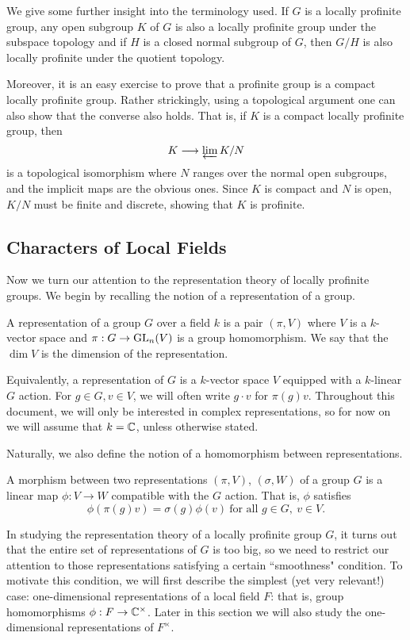We give some further insight into the terminology used. If $G$ is a locally profinite group, any open subgroup $K$ of $G$ is also a locally profinite group under the subspace topology and if $H$ is a closed normal subgroup of $G$, then $G/H$ is also locally profinite under the quotient topology. 

Moreover, it is an easy exercise to prove that a profinite group is a compact locally profinite group. Rather strickingly, using a topological argument one can also show that the converse also holds. That is, if $K$ is a compact locally profinite group, then
$$K\longrightarrow\varprojlim K/N$$
is a topological isomorphism where $N$ ranges over the normal open subgroups, and the implicit maps are the obvious ones. Since $K$ is compact and $N$ is open, $K/N$ must be finite and discrete, showing that $K$ is profinite.

\subsection{Characters of Local Fields}

Now we turn our attention to the representation theory of locally profinite groups. We begin by recalling the notion of a representation of a group.

\begin{defn}
    A representation of a group $G$ over a field $k$ is a pair $(\pi,V)$ where $V$ is a $k$-vector space and $\pi:G\rightarrow\mathrm{GL}_n(V)$ is a group homomorphism. We say that the $\dim V$ is the dimension of the representation.
\end{defn}

Equivalently, a representation of $G$ is a $k$-vector space $V$ equipped with a $k$-linear $G$ action. For $g\in G, v\in V$, we will often write $g\cdot v$ for $\pi(g)v$. Throughout this document, we will only be interested in complex representations, so for now on we will assume that $k=\mathbb{C}$, unless otherwise stated.

Naturally, we also define the notion of a homomorphism between representations.

\begin{defn}
    A morphism between two representations $(\pi,V)$, $(\sigma,W)$ of a group $G$ is a linear map $\phi:V\rightarrow W$ compatible with the $G$ action. That is, $\phi$ satisfies 
    $$\phi(\pi(g)v)=\sigma(g)\phi(v)\ \text{for all } g\in G,\ v\in V.$$
\end{defn}

In studying the representation theory of a locally profinite group $G$, it turns out that the entire set of representations of $G$ is too big, so we need to restrict our attention to those representations satisfying a certain ``smoothness" condition. To motivate this condition, we will first describe the simplest (yet very relevant!) case: one-dimensional representations of a local field $F$: that is, group homomorphisms $\phi:F\rightarrow\mathbb{C}^{\times}$. Later in this section we will also study the one-dimensional representations of $F^{\times}$.

